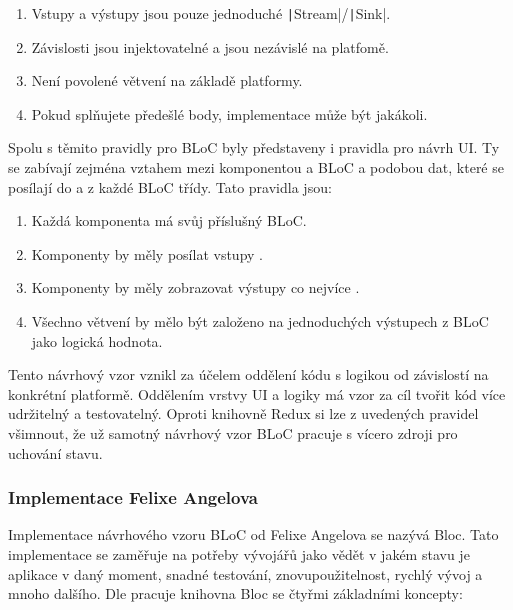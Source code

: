 \begin{enumerate}
    \item Vstupy a výstupy jsou pouze jednoduché
    \texttt|Stream|/\texttt|Sink|.
    \item Závislosti jsou injektovatelné a jsou nezávislé na platfomě.
    \item Není povolené větvení na základě platformy.
    \item Pokud splňujete předešlé body,
    implementace může být jakákoli.
\end{enumerate}

Spolu s těmito pravidly pro BLoC byly představeny i pravidla pro návrh UI.
Ty se zabívají zejména vztahem mezi komponentou a BLoC a podobou dat,
které se posílají do a z každé BLoC třídy.
Tato pravidla jsou:

\begin{enumerate}
    \item Každá  komponenta má svůj příslušný BLoC.
    \item Komponenty by měly posílat vstupy .
    \item Komponenty by měly zobrazovat výstupy co nejvíce .
    \item Všechno větvení by mělo být založeno na jednoduchých výstupech z BLoC
    jako logická hodnota.
\end{enumerate}

Tento návrhový vzor vznikl za účelem oddělení kódu s logikou
od závislostí na konkrétní platformě.
Oddělením vrstvy UI a logiky má vzor za cíl tvořit kód více udržitelný a
testovatelný. \cite{flutterando_analyzing_bloc_mobx}
Oproti knihovně Redux si lze z uvedených pravidel všimnout,
že už samotný návrhový vzor BLoC pracuje s vícero zdroji pro uchování stavu.

\subsubsection{Implementace Felixe Angelova}

Implementace návrhového vzoru BLoC od Felixe Angelova se nazývá Bloc.
\cite{bloclibrary_whybloc}
Tato implementace se zaměřuje na potřeby vývojářů jako
vědět v jakém stavu je aplikace v daný moment, snadné testování,
znovupoužitelnost, rychlý vývoj a mnoho dalšího. 
Dle \cite{bloclibrary_coreconcepts} pracuje knihovna Bloc se čtyřmi základními
koncepty:

